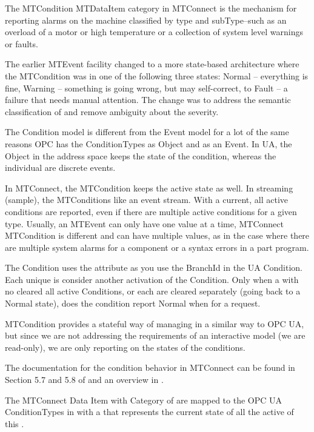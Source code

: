 The \gls{MTCondition} \gls{MTDataItem} \gls{category} in MTConnect is the mechanism for reporting alarms on the machine classified by type and subType--such as an overload of a motor or high temperature or a collection of system level warnings or faults.

The earlier  \gls{MTEvent} facility changed to a more state-based architecture where the \gls{MTCondition} was in one of the following three states: Normal – everything is fine, Warning – something is going wrong, but may self-correct, to Fault – a failure that needs manual attention. The change was to address the semantic classification of  and remove ambiguity about the  severity.

The Condition model is different from the Event model for a lot of the same reasons OPC has the \glspl{ConditionType} as \gls{Object} and as an \gls{Event}. In UA, the \gls{Object} in the address space keeps the state of the condition, whereas the individual  are discrete events.

In MTConnect, the \gls{MTCondition} keeps the active state as well. In streaming (\gls{sample}), the \glspl{MTCondition} like an event stream. With a \gls{current}, all active conditions are reported, even if there are multiple active conditions for a given type. Usually, an \gls{MTEvent} can only have one value at a time, MTConnect \gls{MTCondition} is different and can have multiple values, as in the case where there are multiple system alarms for a component or a syntax errors in a part program.

The Condition uses the attribute  as you use the BranchId in the UA Condition. Each unique  is consider another activation of the Condition. Only when a  with no  cleared all active Conditions, or each are cleared separately (going back to a Normal state), does the condition report Normal when for a  request.

\gls{MTCondition} provides a stateful way of managing  in a similar way to OPC UA, but since we are not addressing the requirements of an interactive model (we are read-only), we are only reporting on the states of the conditions. 

The documentation for the condition behavior in MTConnect can be found in Section 5.7 and 5.8 of \cite{MTCPart3} and an overview in \cite{MTCPart2}.

The MTConnect Data Item with Category of  are mapped to the OPC UA \glspl{ConditionType}  in \cite{UAPart9} with a  that represents the current state of all the active  of this .


